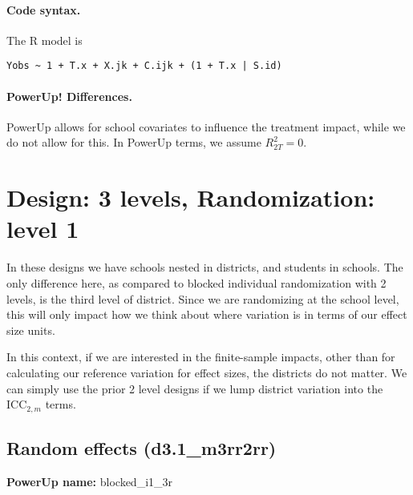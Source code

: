 \documentclass[12pt]{article}
\begin{document}
\paragraph{Code syntax.}
The R model is
\begin{verbatim}
Yobs ~ 1 + T.x + X.jk + C.ijk + (1 + T.x | S.id)
\end{verbatim}

\paragraph{PowerUp! Differences.}
PowerUp allows for school covariates to influence the treatment impact, while we do not allow for this. In PowerUp terms, we assume $R^2_{2T} = 0$.



\newpage 
\section{Design: 3 levels, Randomization: level 1}

In these designs we have schools nested in districts, and students in schools.
The only difference here, as compared to blocked individual randomization with 2 levels, is the third level of district.
Since we are randomizing at the school level, this will only impact how we think about where variation is in terms of our effect size units.

In this context, if we are interested in the finite-sample impacts, other than for calculating our reference variation for effect sizes, the districts do not matter.
We can simply use the prior 2 level designs if we lump district variation into the $\text{ICC}_{2,m}$ terms.



\subsection{Random effects (d3.1\_m3rr2rr)}

\textbf{PowerUp name:} blocked\_i1\_3r
\end{document}
